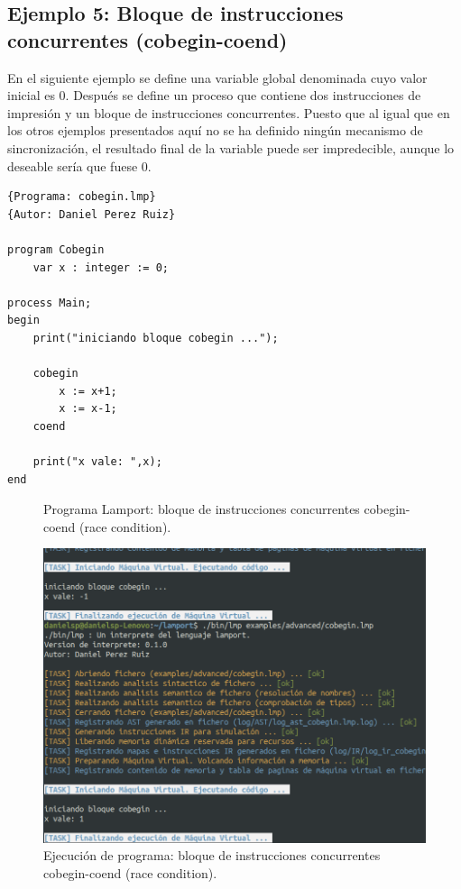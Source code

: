 \subsection{Ejemplo 5: Bloque de instrucciones concurrentes (cobegin-coend)}
En el siguiente ejemplo se define una variable global denominada  cuyo valor inicial es 0. Después se define un proceso  que contiene dos instrucciones de impresión y un bloque de instrucciones concurrentes. Puesto que al igual que en los otros ejemplos presentados aquí no se ha definido ningún mecanismo de sincronización, el resultado final de la variable  puede ser impredecible, aunque lo deseable sería que fuese 0.
\begin{lstlisting}[style=lamportStyle]
{Programa: cobegin.lmp}
{Autor: Daniel Perez Ruiz}

program Cobegin
	var x : integer := 0;
	
process Main;
begin
	print("iniciando bloque cobegin ...");

	cobegin
		x := x+1;
		x := x-1;
	coend
	
	print("x vale: ",x);
end
\end{lstlisting}
\begin{figure}[h]
\caption{Programa Lamport: bloque de instrucciones concurrentes cobegin-coend (race condition).}
\label{fig:lamportCobegin}
\end{figure}

\newpage

\begin{figure}[h]
    \includegraphics[width=\linewidth]{images/ejemplos/concurrentes/cobegin.png}
    \caption{Ejecución de programa: bloque de instrucciones concurrentes cobegin-coend (race condition).}
    \label{fig:lamportCobegin_exec}
\end{figure}

